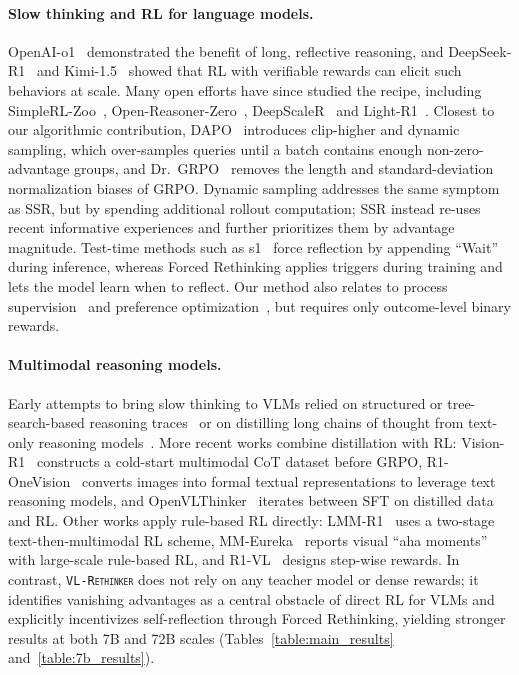 \documentclass{article}
\newcommand{\model}{\texttt{\textsc{VL-Rethinker}}\xspace}
\begin{document}
\paragraph{Slow thinking and RL for language models.} OpenAI-o1~\citep{openai-o1} demonstrated the benefit of long, reflective reasoning, and DeepSeek-R1~\citep{deepseek-r1} and Kimi-1.5~\citep{kimi-1_5} showed that RL with verifiable rewards can elicit such behaviors at scale. Many open efforts have since studied the recipe, including SimpleRL-Zoo~\citep{simplerl}, Open-Reasoner-Zero~\citep{open-reasoner-zero}, DeepScaleR~\citep{deepscaler2025} and Light-R1~\citep{lightr1}. Closest to our algorithmic contribution, DAPO~\citep{dapo} introduces clip-higher and dynamic sampling, which over-samples queries until a batch contains enough non-zero-advantage groups, and Dr.~GRPO~\citep{drgrpo} removes the length and standard-deviation normalization biases of GRPO. Dynamic sampling addresses the same symptom as SSR, but by spending additional rollout computation; SSR instead re-uses recent informative experiences and further prioritizes them by advantage magnitude. Test-time methods such as s1~\citep{s1} force reflection by appending ``Wait'' during inference, whereas Forced Rethinking applies triggers during training and lets the model learn when to reflect. Our method also relates to process supervision~\citep{letsverify} and preference optimization~\citep{DPO,instructgpt}, but requires only outcome-level binary rewards.

\paragraph{Multimodal reasoning models.} Early attempts to bring slow thinking to VLMs relied on structured or tree-search-based reasoning traces~\citep{llavacot,xu2024llava,Mulberry,llamav_o1,insight_v} or on distilling long chains of thought from text-only reasoning models~\citep{virgo}. More recent works combine distillation with RL: Vision-R1~\citep{vision-r1} constructs a cold-start multimodal CoT dataset before GRPO, R1-OneVision~\citep{R1OneVision} converts images into formal textual representations to leverage text reasoning models, and OpenVLThinker~\citep{OpenVLThinker} iterates between SFT on distilled data and RL. Other works apply rule-based RL directly: LMM-R1~\citep{lmm-r1} uses a two-stage text-then-multimodal RL scheme, MM-Eureka~\citep{mmeureka} reports visual ``aha moments'' with large-scale rule-based RL, and R1-VL~\citep{r1vl} designs step-wise rewards. In contrast, \model does not rely on any teacher model or dense rewards; it identifies vanishing advantages as a central obstacle of direct RL for VLMs and explicitly incentivizes self-reflection through Forced Rethinking, yielding stronger results at both 7B and 72B scales (Tables~\ref{table:main_results} and~\ref{table:7b_results}).
\end{document}
